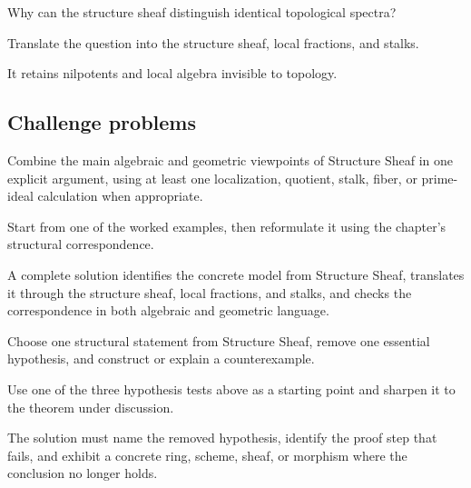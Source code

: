 \begin{exercise}\label{exr:vi17-expand-14}
Why can the structure sheaf distinguish identical topological spectra?
\end{exercise}
\begin{hint}
Translate the question into the structure sheaf, local fractions, and stalks.
\end{hint}
\begin{solution}
It retains nilpotents and local algebra invisible to topology.
\end{solution}

\subsection*{Challenge problems}

\begin{exercise}\label{exr:vi17-expand-15}
Combine the main algebraic and geometric viewpoints of Structure Sheaf in one explicit argument, using at least one localization, quotient, stalk, fiber, or prime-ideal calculation when appropriate.
\end{exercise}
\begin{hint}
Start from one of the worked examples, then reformulate it using the chapter's structural correspondence.
\end{hint}
\begin{solution}
A complete solution identifies the concrete model from Structure Sheaf, translates it through the structure sheaf, local fractions, and stalks, and checks the correspondence in both algebraic and geometric language.
\end{solution}

\begin{exercise}\label{exr:vi17-expand-16}
Choose one structural statement from Structure Sheaf, remove one essential hypothesis, and construct or explain a counterexample.
\end{exercise}
\begin{hint}
Use one of the three hypothesis tests above as a starting point and sharpen it to the theorem under discussion.
\end{hint}
\begin{solution}
The solution must name the removed hypothesis, identify the proof step that fails, and exhibit a concrete ring, scheme, sheaf, or morphism where the conclusion no longer holds.
\end{solution}

